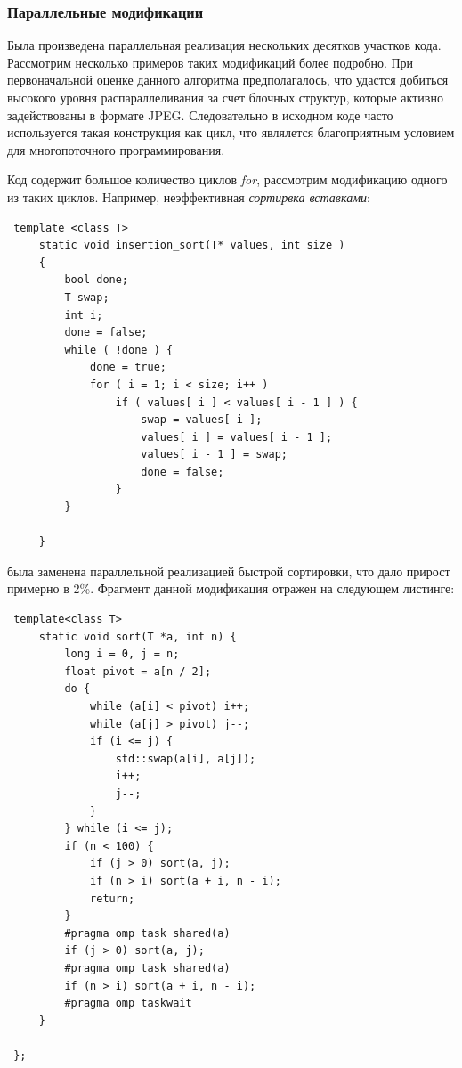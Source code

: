 \documentclass{matmex-diploma-custom}
\begin{document}
\subsubsection{Параллельные модификации}
Была произведена параллельная реализация нескольких десятков участков кода. Рассмотрим несколько примеров таких модификаций более подробно.
При первоначальной оценке данного алгоритма предполагалось, что удастся добиться высокого уровня распараллеливания за счет блочных  структур, которые активно задействованы в формате JPEG. Следовательно в исходном коде часто используется такая конструкция как цикл, что являлется благоприятным условием для многопоточного программирования.

Код содержит большое количество циклов \emph{for}, рассмотрим модификацию одного из таких циклов. Например, неэффективная \emph{сортирвка вставками}:

 \begin{lstlisting}
 template <class T>
     static void insertion_sort(T* values, int size )
     {
         bool done;
         T swap;
         int i;
         done = false;
         while ( !done ) {
             done = true;
             for ( i = 1; i < size; i++ )
                 if ( values[ i ] < values[ i - 1 ] ) {
                     swap = values[ i ];
                     values[ i ] = values[ i - 1 ];
                     values[ i - 1 ] = swap;
                     done = false;
                 }
         }

     }
 \end{lstlisting}

 была заменена параллельной реализацией быстрой сортировки, что дало прирост примерно в 2\%. Фрагмент данной модификация отражен на следующем листинге:

 \begin{lstlisting}
 template<class T>
     static void sort(T *a, int n) {
         long i = 0, j = n;
         float pivot = a[n / 2];
         do {
             while (a[i] < pivot) i++;
             while (a[j] > pivot) j--;
             if (i <= j) {
                 std::swap(a[i], a[j]);
                 i++;
                 j--;
             }
         } while (i <= j);
         if (n < 100) {
             if (j > 0) sort(a, j);
             if (n > i) sort(a + i, n - i);
             return;
         }
         #pragma omp task shared(a)
         if (j > 0) sort(a, j);
         #pragma omp task shared(a)
         if (n > i) sort(a + i, n - i);
         #pragma omp taskwait
     }

 };
 \end{lstlisting}
\end{document}
